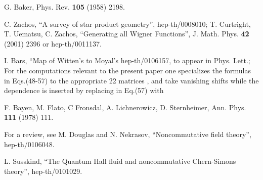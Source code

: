 \documentclass[a4paper,12pt]{article}
\begin{document}
\begin{thebibliography}{9}
  G. Baker, Phys. Rev. \textbf{105} (1958) 2198.

  C. Zachos, ``A survey of star product geometry'',
hep-th/0008010; T. Curtright, T. Uematsu, C. Zachos, ``Generating all Wigner
Functions'', J. Math. Phys. \textbf{42} (2001) 2396 or hep-th/0011137.

  I. Bars, ``Map of Witten's \myHighlight{$\star $}\coordHE{} to Moyal's \coordHE{}
hep-th/0106157, to appear in Phys. Lett.; For the computations relevant to
the present paper one specializes the formulas in Eqs.(48-57) to the
appropriate 2\myHighlight{$\times $}\coordHE{}2 matrices \coordHE{}, and take vanishing shifts \coordHE{} while the \myHighlight{$\theta $}\coordHE{} dependence is inserted by
replacing \myHighlight{$\sigma $}\coordHE{} in Eq.(57) with \coordHE{}

  F. Bayen, M. Flato, C Fronsdal, A. Lichnerowicz, D.
Sternheimer, Ann. Phys. \textbf{111 }(1978) 111.

  For a review, see M. Douglas and N. Nekrasov,
``Noncommutative field theory'', hep-th/0106048.

  L. Susskind, ``The Quantum Hall fluid and noncommutative
Chern-Simons theory'', hep-th/0101029.
\end{thebibliography}

\bigskip
\end{document}
